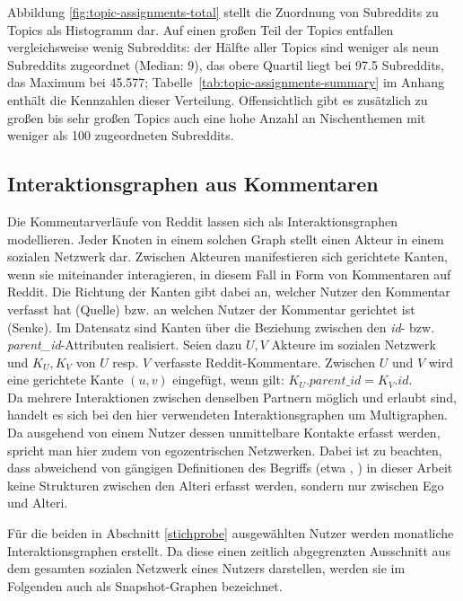 \documentclass[11pt,a4paper,twoside]{article}
\begin{document}
Abbildung \ref{fig:topic-assignments-total} stellt die Zuordnung von
Subreddits zu Topics als Histogramm dar. Auf einen großen Teil der
Topics entfallen vergleichsweise wenig Subreddits: der Hälfte aller
Topics sind weniger als neun Subreddits zugeordnet (Median: 9), das
obere Quartil liegt bei 97.5 Subreddits, das Maximum bei 45.577;
Tabelle~\ref{tab:topic-assignments-summary} im Anhang enthält die
Kennzahlen dieser Verteilung. Offensichtlich gibt es zusätzlich zu
großen bis sehr großen Topics auch eine hohe Anzahl an Nischenthemen mit
weniger als 100 zugeordneten Subreddits.







\hypertarget{interaktionsgraphen}{%
\subsection{Interaktionsgraphen aus
Kommentaren}\label{interaktionsgraphen}}

Die Kommentarverläufe von Reddit lassen sich als Interaktionsgraphen
modellieren. Jeder Knoten in einem solchen Graph stellt einen Akteur in
einem sozialen Netzwerk dar. Zwischen Akteuren manifestieren sich
gerichtete Kanten, wenn sie miteinander interagieren, in diesem Fall in
Form von Kommentaren auf Reddit. Die Richtung der Kanten gibt dabei an,
welcher Nutzer den Kommentar verfasst hat (Quelle) bzw. an welchen
Nutzer der Kommentar gerichtet ist (Senke). Im Datensatz sind Kanten
über die Beziehung zwischen den \emph{id}- bzw.
\emph{parent\_id}-Attributen realisiert. Seien dazu \(U, V\) Akteure im
sozialen Netzwerk und \(K_U, K_V\) von \(U\) resp. \(V\) verfasste
Reddit-Kommentare. Zwischen \(U\) und \(V\) wird eine gerichtete Kante
\((u,v)\) eingefügt, wenn gilt: \(K_{U}.parent\_id = K_{V}.id\).\\
Da mehrere Interaktionen zwischen denselben Partnern möglich und erlaubt
sind, handelt es sich bei den hier verwendeten Interaktionsgraphen um
Multigraphen. Da ausgehend von einem Nutzer dessen unmittelbare Kontakte
erfasst werden, spricht man hier zudem von egozentrischen Netzwerken.
Dabei ist zu beachten, dass abweichend von gängigen Definitionen des
Begriffs (etwa \autocite[S. 42]{Wasserman1994}, \autocite{Wolf2010}) in
dieser Arbeit keine Strukturen zwischen den Alteri erfasst werden,
sondern nur zwischen Ego und Alteri.

Für die beiden in Abschnitt \ref{stichprobe} ausgewählten Nutzer werden
monatliche Interaktionsgraphen erstellt. Da diese einen zeitlich
abgegrenzten Ausschnitt aus dem gesamten sozialen Netzwerk eines Nutzers
darstellen, werden sie im Folgenden auch als Snapshot-Graphen
bezeichnet.
\end{document}
